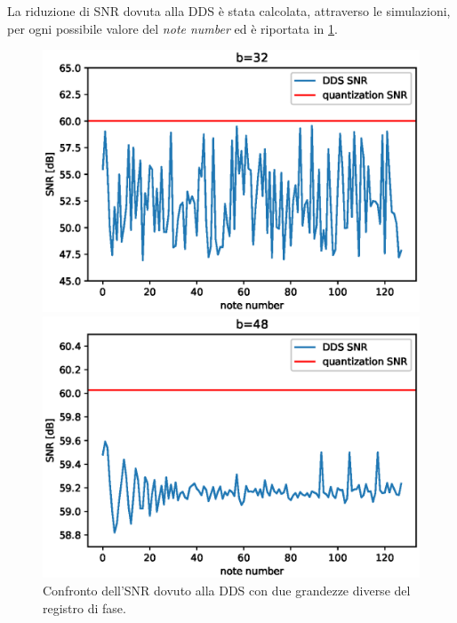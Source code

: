 La riduzione di SNR dovuta alla DDS è stata calcolata, attraverso le simulazioni,
per ogni possibile valore del \textit{note number} ed è riportata in \cref{fig:confronto}.
\begin{figure}[H]
    \begin{minipage}{0.59\columnwidth}
            \centering
            \includegraphics[width=1.0\columnwidth]{TeX_files/dds_snr_32.eps} %
        \end{minipage}\hfill
    \begin{minipage}{0.59\columnwidth}
            \centering
            \includegraphics[width=1.0\columnwidth]{TeX_files/dds_snr_48.eps} %
    \end{minipage}
    \caption{Confronto dell'SNR dovuto alla DDS con due grandezze diverse del registro di fase.}
    \label{fig:confronto}
\end{figure}

